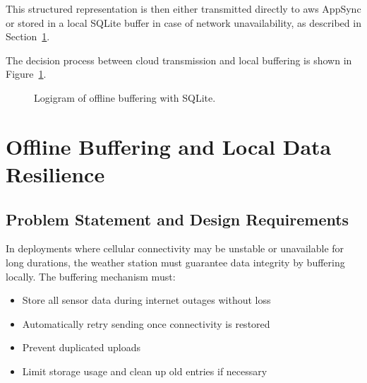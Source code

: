 This structured representation is then either transmitted directly to \gls{aws} AppSync or stored in a local SQLite buffer in case of network unavailability, as described in Section~\ref{sec:offline-buffering}.

The decision process between cloud transmission and local buffering is shown in Figure~\ref{fig:flow-buffering}.

\begin{figure}[H]
\centering
{}
\caption{Logigram of offline buffering with SQLite.}
\label{fig:flow-buffering}
\end{figure}


\section{Offline Buffering and Local Data Resilience}
\label{sec:offline-buffering}

\subsection{Problem Statement and Design Requirements}

In deployments where cellular connectivity may be unstable or unavailable for long durations, the weather station must guarantee data integrity by buffering locally. The buffering mechanism must:

\begin{itemize}
    \item Store all sensor data during internet outages without loss
    \item Automatically retry sending once connectivity is restored
    \item Prevent duplicated uploads
    \item Limit storage usage and clean up old entries if necessary
\end{itemize}


